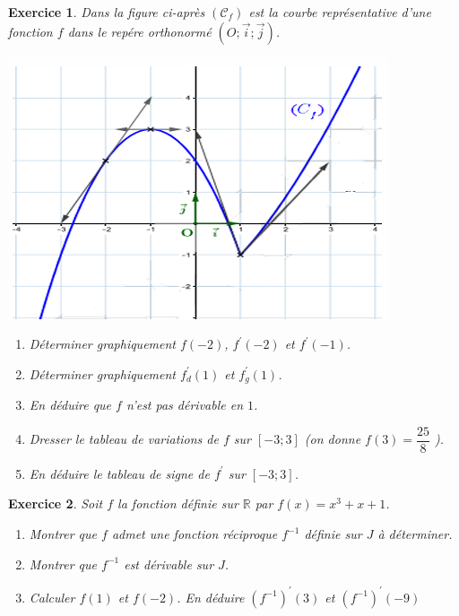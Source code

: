 \documentclass[12pt,a4paper]{article}
\theoremstyle{mystyle}
\newtheorem{exo}{Exercice}
\begin{document}
\begin{multicols*}{2}
\begin{exo}
	Dans la figure ci-après $(\mathcal{C}_f)$ est la courbe représentative d'une fonction $f$ dans le repére orthonormé $(O;\overrightarrow{i};\overrightarrow{j})$.
	\begin{center}
		\includegraphics{graphe2.png}
	\end{center}
	\begin{enumerate}
		\item Déterminer graphiquement $f(-2)$, $f^{\prime}(-2)$ et $f^{\prime}(-1)$.
		\item Déterminer graphiquement $f^{\prime}_d(1)$ et $f^{\prime}_g(1)$.
		\item En déduire que $f$ n'est pas dérivable en $1$.
		\item Dresser le tableau de variations de $f$ sur $[-3;3]$ (on donne $f(3) = \dfrac{25}{8} $ ).
		\item En déduire le tableau de signe de $f^{\prime}$ sur $[-3;3]$.
		\end{enumerate}	
\end{exo}

\columnbreak

\begin{exo}
Soit $f$ la fonction définie sur $\mathbb{R}$ par $f(x) = x^3 + x + 1$.
	\begin{enumerate}
		\item Montrer que $f$ admet une fonction réciproque $f^{-1}$ définie sur $J$ à déterminer.
		\item Montrer que $f^{-1}$ est dérivable sur $J$.
		\item Calculer $f(1)$ et $f(-2)$. En déduire $\left(f^{-1}\right)^{\prime}(3)$ et $\left(f^{-1}\right)^{\prime}(-9)$
	\end{enumerate}
\end{exo}




\end{multicols*}
\end{document}
